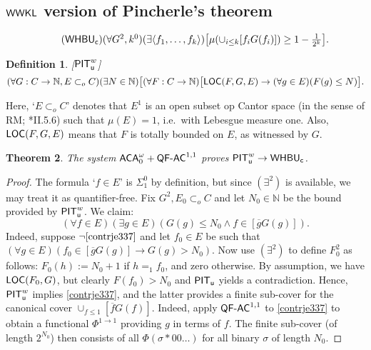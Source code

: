 \documentclass[reqno]{amsart}
\newtheorem{thm}{Theorem}
\newtheorem{defi}[thm]{Definition}
\newcommand\be{\begin{equation}}
\newcommand\ee{\end{equation}}
\def\bdefi{\begin{defi}\rm}
\def\edefi{\end{defi}}
\def\LOC{\textup{\textsf{LOC}}}
\def\PIT{\textup{\textsf{PIT}}}
\def\PR{\textup{\textsf{PR}}}
\def\u{\textup{\textsf{u}}}
\def\c{\textup{\textsf{c}}}
\def\WWKL{\textup{\textsf{WWKL}}}
\def\N{{\mathbb  N}}
\def\di{\rightarrow}
\def\asa{\leftrightarrow}
\def\ACA{\textup{\textsf{ACA}}}
\def\QFAC{\textup{\textsf{QF-AC}}}
\def\HBU{\textup{\textsf{HBU}}}
\def\WHBU{\textup{\textsf{WHBU}}}
\def\SCF{\textup{\textsf{SCF}}}
\numberwithin{equation}{section}
\numberwithin{thm}{section}
\begin{document}
\subsection{$\WWKL$ version of Pincherle's theorem}
\be\tag{$\WHBU_{\c}$}\textstyle
(\forall G^{2}, k^{0})(\exists \langle f_{1}, \dots, f_{k} \rangle )\big[ \mu(\cup_{i\leq k} [f_{i}G(f_{i})])\geq 1-\frac{1}{2^{k}}  \big].
\ee
\bdefi[$\PIT_{\u}^{w}$]
\[
(\forall G:C\di \N, E \subset_{o} C)(\exists N\in \N )\big[ (\forall F:C\di \N)\big[  \LOC(F, G, E)\di (\forall g \in E)(F(g)\leq N)\big].
\]
\edefi
Here, `$E\subset_{o}C$' denotes that $E^{1}$ is an open subset op Cantor space (in the sense of RM; \cite{simpson2}*{II.5.6}) such that $\mu(E)=1$, i.e.\ with Lebesgue measure one. 
Also, $\LOC(F, G, E)$ means that $F$ is totally bounded on $E$, as witnessed by $G$.  
\begin{thm}\label{krooi2} 
The system $\ACA_{0}^{\omega}+\QFAC^{1,1}$ proves $\PIT_{\u}^{w}\di \WHBU_{\c}$. 
\end{thm}
\begin{proof}
The formula `$f\in E$' is $\Sigma_{1}^{0}$ by definition, but since $(\exists^{2})$ is available, we may treat it as quantifier-free.  
Fix $G^{2}, E_{0}\subset_{o}C$ and let $N_{0}\in \N$ be the bound provided by $\PIT_{\u}^{w}$.  
We claim:
\be\label{contrje337}
(\forall f\in E)(\exists g\in E)(G(g)\leq N_{0}\wedge f\in[ \overline{g}G(g)]).
\ee
Indeed, suppose $\neg\eqref{contrje337}$ and let $f_{0}\in E$ be such that $(\forall g\in E)( f_{0}\in [\overline{g}G(g)]\di G(g)> N_{0})$.
Now use $(\exists^{2})$ to define $F_{0}^{2}$ as follows: $F_{0}(h):=N_{0}+1$ if $h=_{1}f_{0}$, and zero otherwise.   
By assumption, we have $\LOC(F_{0}, G)$, but clearly $F(f_{0})>N_{0}$ and $\PIT_{\u}$ yields a contradiction.  
Hence, $\PIT_{\u}^{w}$ implies \eqref{contrje337}, and the latter provides a finite sub-cover for the canonical cover $\cup_{f\leq 1}[\overline{f}G(f)]$.  
Indeed, apply $\QFAC^{1,1}$ to \eqref{contrje337} to obtain a functional $\Phi^{1\di 1}$ providing $g$ in terms of $f$.  
The finite sub-cover (of length $2^{N_{0}}$) then consists of all $\Phi(\sigma*00\dots)$ for all binary $\sigma$ of length $N_{0}$.  
% 
%
\end{proof}
\end{document}
